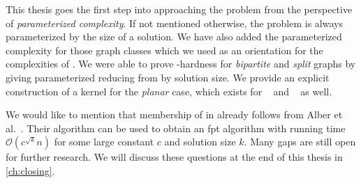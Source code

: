This thesis goes the first step into approaching the problem from the perspective of \textit{parameterized complexity}.
If not mentioned otherwise, the problem is always parameterized by the size of a solution.
We have also added the parameterized complexity for those graph classes which we used as an orientation for the complexities of \sdom.
We were able to prove \WTWO-hardness for \textit{bipartite} and \textit{split} graphs by giving parameterized reducing from \doms by solution size. We provide an explicit construction of a kernel for the \textit{planar} case, which exists for \doms~\cite{Alber2004} and \tdoms~\cite{Garnero2019} as well.

We would like to mention that membership of \psdom in \FPT already follows from Alber et al.~\cite{Alber2002}.
Their algorithm \pdomp can be used to obtain an fpt algorithm with running time $\mathcal{O}(c^{\sqrt{k}}n)$ for some large constant $c$ and solution size $k$.
Many gaps are still open for further research.
We will discuss these questions at the end of this thesis in \cref{ch:closing}.

